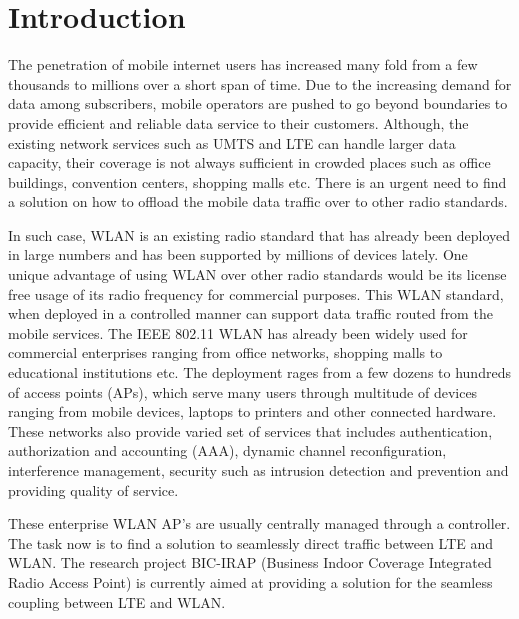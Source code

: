 
\chapter{Introduction}\label{ch:introduction}
\sffamily{}
The penetration of mobile internet users has increased many fold from a few thousands to millions over a short span of time. Due to the increasing demand for data among subscribers, mobile operators are pushed to go beyond boundaries to provide efficient and reliable data service to their customers. Although, the existing network services such as UMTS and LTE can handle larger data capacity, their coverage is not always sufficient in crowded places such as office buildings, convention centers, shopping malls etc. There is an urgent need to find a solution on how to offload the mobile data traffic over to other radio standards.

In such case, WLAN is an existing radio standard that has already been deployed in large numbers and has been supported by millions of devices lately. One unique advantage of using WLAN over other radio standards would be its license free usage of its radio frequency for commercial purposes. This WLAN standard, when deployed in a controlled manner can support data traffic routed from the mobile services. The IEEE 802.11 WLAN has already been widely used for commercial enterprises ranging from office networks, shopping malls to educational institutions etc. The deployment rages from a few dozens to hundreds of access points (APs), which serve many users through multitude of devices ranging from mobile devices, laptops to printers and other connected hardware. These networks also provide varied set of services that includes authentication, authorization and accounting (AAA), dynamic channel reconfiguration, interference management, security such as intrusion detection and prevention and providing quality of service. 

These enterprise WLAN AP’s are usually centrally managed through a controller. The task now is to find a solution to seamlessly direct traffic between LTE and WLAN. The research project BIC-IRAP (Business Indoor Coverage Integrated Radio Access Point) is currently aimed at providing a solution for the seamless coupling between LTE and WLAN.

